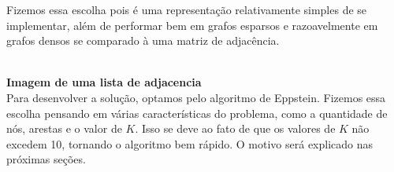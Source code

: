 \documentclass[12pt]{article}
\begin{document}
    Fizemos essa escolha pois é uma representação relativamente simples de se
    implementar, além de performar bem em grafos esparsos e razoavelmente em
    grafos densos se comparado à uma matriz de adjacência.

    \\
    \textbf{Imagem de uma lista de adjacencia}
    \\

    Para desenvolver a solução, optamos pelo algoritmo de Eppstein. Fizemos essa
    escolha pensando em várias características do problema, como a quantidade de
    nós, arestas e o valor de $K$. Isso se deve ao fato de que os valores de $K$
    não excedem 10, tornando o algoritmo bem rápido. O motivo será explicado nas
    próximas seções.




    
    \printbibliography[title={Whole bibliography}]
\end{document}
